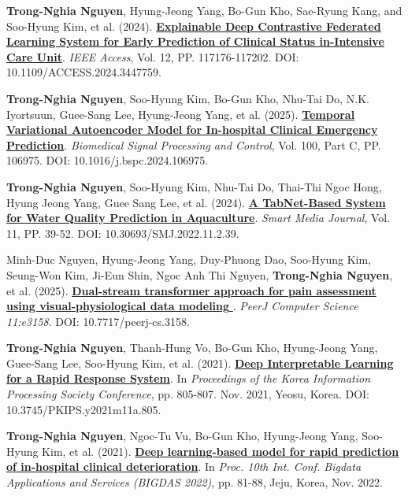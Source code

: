 \documentclass[a4paper,11pt]{article}
\begin{document}
\item[\textbf{[J.2]}] \textbf{Trong-Nghia Nguyen}, Hyung-Jeong Yang, Bo-Gun Kho, Sae-Ryung Kang, and Soo-Hyung Kim, et al. (2024). \href{https://ieeexplore.ieee.org/document/10643963}{\textbf{Explainable Deep Contrastive Federated Learning System for Early Prediction of Clinical Status in-Intensive Care Unit}}. \textit{IEEE Access}, Vol. 12, PP. 117176-117202. DOI: 10.1109/ACCESS.2024.3447759.

\item[\textbf{[J.3]}] \textbf{Trong-Nghia Nguyen}, Soo-Hyung Kim, Bo-Gun Kho, Nhu-Tai Do, N.K. Iyortsuun, Guee-Sang Lee, Hyung-Jeong Yang, et al. (2025). \href{https://www.sciencedirect.com/science/article/pii/S1746809424010334}{\textbf{Temporal Variational Autoencoder Model for In-hospital Clinical Emergency Prediction}}. \textit{Biomedical Signal Processing and Control}, Vol. 100, Part C, PP. 106975. DOI: 10.1016/j.bspc.2024.106975.

\item[\textbf{[J.4]}] \textbf{Trong-Nghia Nguyen}, Soo-Hyung Kim, Nhu-Tai Do, Thai-Thi Ngoc Hong, Hyung Jeong Yang, Guee Sang Lee, et al. (2024). \href{https://koreascience.or.kr/article/JAKO202211040704921.page}{\textbf{A TabNet-Based System for Water Quality Prediction in Aquaculture}}. \textit{Smart Media Journal}, Vol. 11, PP. 39-52. DOI: 10.30693/SMJ.2022.11.2.39.

\item[\textbf{[J.5]}] Minh-Duc Nguyen, Hyung-Jeong Yang, Duy-Phuong Dao, Soo-Hyung Kim, Seung-Won Kim, Ji-Eun Shin, Ngoc Anh Thi Nguyen, \textbf{Trong-Nghia Nguyen}, et al. (2025). \href{https://peerj.com/articles/cs-3158/}{\textbf{Dual-stream transformer approach for pain assessment using visual-physiological data modeling
}}. \textit{PeerJ Computer Science 11:e3158}. DOI: 10.7717/peerj-cs.3158.

\item[\textbf{[C.1]}] \textbf{Trong-Nghia Nguyen}, Thanh-Hung Vo, Bo-Gun Kho, Hyung-Jeong Yang, Guee-Sang Lee, Soo-Hyung Kim, et al. (2021). \href{https://koreascience.or.kr/article/CFKO202133648994961.page}{\textbf{Deep Interpretable Learning for a Rapid Response System}}. In \textit{Proceedings of the Korea Information Processing Society Conference}, pp. 805-807. Nov. 2021, Yeosu, Korea. DOI: 10.3745/PKIPS.y2021m11a.805.

\item[\textbf{[C.2]}] \textbf{Trong-Nghia Nguyen}, Ngoc-Tu Vu, Bo-Gun Kho, Hyung-Jeong Yang, Soo-Hyung Kim, et al. (2021). \href{https://www.researchgate.net/publication/381229270_Deep_learning-based_model_for_rapid_prediction_of_in-_hospital_clinical_deterioration}{\textbf{Deep learning-based model for rapid prediction of in-hospital clinical deterioration}}. In \textit{Proc. 10th Int. Conf. Bigdata Applications and Services (BIGDAS 2022)}, pp. 81-88, Jeju, Korea, Nov. 2022.
\end{document}
